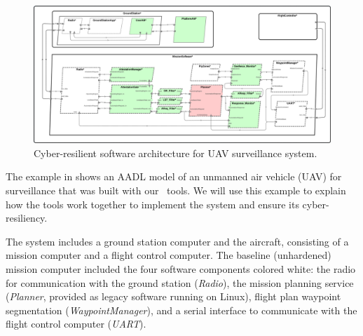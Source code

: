 \begin{figure}
	\begin{center}
	  \includegraphics[width=\textwidth]{./figs/sw-hardened.png}
  \end{center}
	\caption{Cyber-resilient software architecture for UAV surveillance system. } 
	\label{fig:sw-hardened} 
\end{figure}

The example in  shows an AADL model
of an unmanned air vehicle (UAV) for surveillance that was built with our \briefcase \ tools.  
We will use this example to explain how the tools work together to implement the system
and ensure its cyber-resiliency.  

The system includes a ground station computer and the aircraft, consisting of a mission computer and 
a flight control computer.  
The baseline (unhardened) mission computer included the four software components colored white: 
the radio for communication with the ground station (\emph{Radio}), 
the mission planning service (\emph{Planner}, provided as legacy software running on Linux), 
flight plan waypoint segmentation (\emph{WaypointManager}), 
and a serial interface to communicate with the flight control computer (\emph{UART}).

